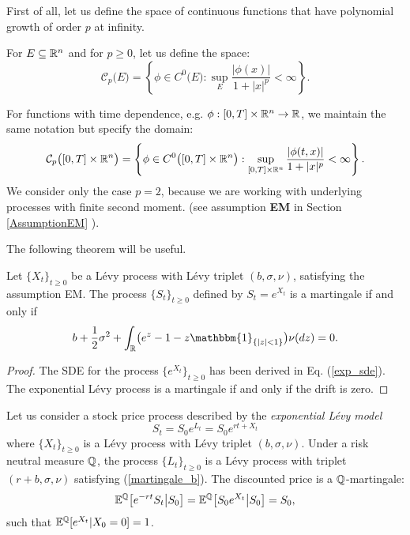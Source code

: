 First of all, let us define the space of continuous functions that have polynomial growth of order $p$ at infinity.
\begin{Definition}\label{Cp}
 For $E \subseteq \mathbb{R}^n$ and for $p\geq 0$, let us define the space:
\begin{equation}
 \mathcal{C}_p \bigl( E \bigr) = \left\{  \phi \in C^0\bigl( E \bigr) : \sup_{E} 
 \frac{|\phi(x)|}{1+|x|^p} <\infty   \right\}. 
\end{equation}
\end{Definition}
For functions with time dependence, e.g. $\phi : [0,T] \times \mathbb{R}^n \to \mathbb{R}$, we maintain the same notation but specify the domain: 
\begin{equation}
 \mathcal{C}_p \bigl([0,T] \times \mathbb{R}^n \bigr) = \left\{  \phi \in C^0\bigl( [0,T] \times \mathbb{R}^n \bigr) : \sup_{[0,T] \times \mathbb{R}^n} 
 \frac{|\phi(t,x)|}{1+|x|^p} <\infty   \right\}. 
\end{equation}
We consider only the case $p=2$, because we are working with underlying processes with finite second moment. (see assumption \textbf{EM} in Section \ref{AssumptionEM} ).

The following theorem will be useful.
\begin{Theorem}
 Let $\{X_t\}_{t\geq0}$ be a Lévy process with Lévy triplet $(b,\sigma,\nu)$, satisfying the assumption EM. 
 The process $\{S_t\}_{t\geq0}$ defined by $S_t = e^{X_t}$ is a martingale if and only if
 \begin{equation}\label{martingale_b}
  b +\frac{1}{2} \sigma^2  + \int_{\R} \bigl( e^z-1 -z\mathbbm{1}_{\{ |z|<1 \}} \bigr) \nu(dz) = 0.
 \end{equation}
\end{Theorem}
\begin{proof}
 The SDE for the process $\{e^{X_t}\}_{t\geq0}$ has been derived in Eq. (\ref{exp_sde}). The exponential Lévy process is a martingale if and only if the drift is zero.
\end{proof}
Let us consider a stock price process described by the \emph{exponential Lévy model}
\begin{equation}\label{ELM2}
 S_t = S_0 e^{L_t} = S_0 e^{rt + X_t}
\end{equation}
where $\{X_t\}_{t\geq 0}$ is a Lévy process with Lévy triplet $(b,\sigma,\nu)$. Under a risk neutral measure $\mathbb{Q}$, the process $\{L_t\}_{t\geq 0}$ 
is a Lévy process with triplet $(r+b,\sigma,\nu)$ 
satisfying (\ref{martingale_b}).  
The discounted price is a $\mathbb{Q}$-martingale:
\begin{equation}
 \mathbb{E}^{\mathbb{Q}} \bigl[ e^{-rt} S_t \bigr| S_0 \bigr] =  \mathbb{E}^{\mathbb{Q}} \bigl[ S_0e^{X_t} \bigr| S_0 \bigr] = S_0, 
\end{equation}
such that $\mathbb{E}^{\mathbb{Q}}[ e^{X_t} | X_0=0] = 1 $. 

